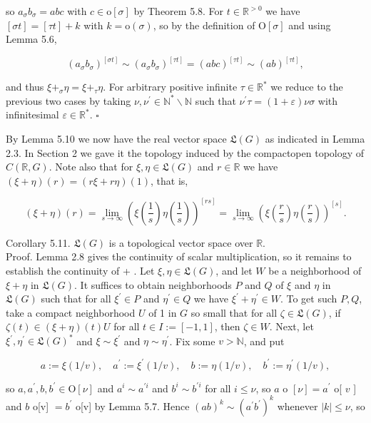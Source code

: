 \documentclass[10pt]{article}
\begin{document}
so $a_{\sigma} b_{\sigma}=a b c$ with $c \in \mathrm{o}[\sigma]$ by Theorem 5.8. For $t \in \mathbb{R}^{>0}$ we have $[\sigma t]=[\tau t]+k$ with $k=\mathrm{o}(\sigma)$, so by the definition of $\mathrm{O}[\sigma]$ and using Lemma 5.6,

$$
\left(a_{\sigma} b_{\sigma}\right)^{[\sigma t]} \sim\left(a_{\sigma} b_{\sigma}\right)^{[\tau t]}=(a b c)^{[\tau t]} \sim(a b)^{[\tau t]},
$$

and thus $\xi+_{\sigma} \eta=\xi+_{\tau} \eta$. For arbitrary positive infinite $\tau \in \mathbb{R}^{*}$ we reduce to the previous two cases by taking $\nu, \nu^{\prime} \in \mathbb{N}^{*} \backslash \mathbb{N}$ such that $\nu^{\prime} \tau=(1+\varepsilon) \nu \sigma$ with infinitesimal $\varepsilon \in \mathbb{R}^{*}$. \(\square\)

By Lemma 5.10 we now have the real vector space $\mathfrak{L}(G)$ as indicated in Lemma 2.3. In Section 2 we gave it the topology induced by the compactopen topology of $C(\mathbb{R}, G)$. Note also that for $\xi, \eta \in \mathfrak{L}(G)$ and $r \in \mathbb{R}$ we have $(\xi+\eta)(r)=(r \xi+r \eta)(1)$, that is,

$$
(\xi+\eta)(r)=\lim _{s \rightarrow \infty}\left(\xi\left(\frac{1}{s}\right) \eta\left(\frac{1}{s}\right)\right)^{[r s]}=\lim _{s \rightarrow \infty}\left(\xi\left(\frac{r}{s}\right) \eta\left(\frac{r}{s}\right)\right)^{[s]} .
$$

Corollary 5.11. $\mathfrak{L}(G)$ is a topological vector space over $\mathbb{R}$.\\
Proof. Lemma 2.8 gives the continuity of scalar multiplication, so it remains to establish the continuity of + . Let $\xi, \eta \in \mathfrak{L}(G)$, and let $W$ be a neighborhood of $\xi+\eta$ in $\mathfrak{L}(G)$. It suffices to obtain neighborhoods $P$ and $Q$ of $\xi$ and $\eta$ in $\mathfrak{L}(G)$ such that for all $\xi^{\prime} \in P$ and $\eta^{\prime} \in Q$ we have $\xi^{\prime}+\eta^{\prime} \in W$. To get such $P, Q$, take a compact neighborhood $U$ of 1 in $G$ so small that for all $\zeta \in \mathfrak{L}(G)$, if $\zeta(t) \in(\xi+\eta)(t) U$ for all $t \in I:=[-1,1]$, then $\zeta \in W$. Next, let $\xi^{\prime}, \eta^{\prime} \in \mathfrak{L}(G)^{*}$ and $\xi \sim \xi^{\prime}$ and $\eta \sim \eta^{\prime}$. Fix some $v>\mathbb{N}$, and put

$$
a:=\xi(1 / v), \quad a^{\prime}:=\xi^{\prime}(1 / v), \quad b:=\eta(1 / v), \quad b^{\prime}:=\eta^{\prime}(1 / v),
$$

so $a, a^{\prime}, b, b^{\prime} \in \mathrm{O}[\nu]$ and $a^{i} \sim a^{\prime i}$ and $b^{i} \sim b^{\prime i}$ for all $i \leq \nu$, so $a$ o $[\nu]=a^{\prime}$ o[ $v$ ] and $b$ o[v] $=b^{\prime}$ o[v] by Lemma 5.7. Hence $(a b)^{k} \sim\left(a^{\prime} b^{\prime}\right)^{k}$ whenever $|k| \leq \nu$, so
\end{document}
